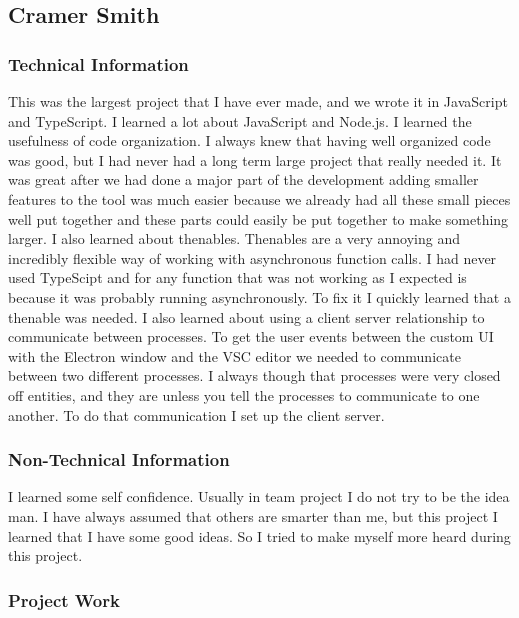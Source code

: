 \documentclass[letterpaper,10pt,titlepage,draftclsnofoot,onecolumn,onesided] {IEEEtran}
\begin{document}
\subsection{Cramer Smith}

\subsubsection{Technical Information}

This was the largest project that I have ever made, and we wrote it in JavaScript and TypeScript. 
I learned a lot about JavaScript and Node.js.
I learned the usefulness of code organization. 
I always knew that having well organized code was good, but I had never had a long term large project that really needed it.
It was great after we had done a major part of the development adding smaller features to the tool was much easier because we already had all these small pieces well put together and these parts could easily be put together to make something larger.
I also learned about thenables. 
Thenables are a very annoying and incredibly flexible way of working with asynchronous function calls.
I had never used TypeScipt and for any function that was not working as I expected is because it was probably running asynchronously. 
To fix it I quickly learned that a thenable was needed.
I also learned about using a client server relationship to communicate between processes.
To get the user events between the custom UI with the Electron window and the VSC editor we needed to communicate between two different processes. 
I always though that processes were very closed off entities, and they are unless you tell the processes to communicate to one another. 
To do that communication I set up the client server. \\

\subsubsection{Non-Technical Information}

I learned some self confidence.
Usually in team project I do not try to be the idea man. 
I have always assumed that others are smarter than me, but this project I learned that I have some good ideas.
So I tried to make myself more heard during this project. \\

\subsubsection{Project Work}
\end{document}
